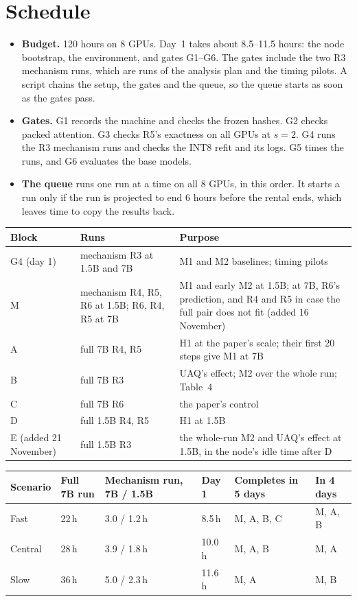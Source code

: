 \documentclass[11pt]{article}
\begin{document}
\section{Schedule}\label{sec:schedule}
\begin{itemize}
\item \textbf{Budget.} 120 hours on 8 GPUs. Day~1 takes about 8.5--11.5 hours: the node bootstrap, the environment, and gates G1--G6. The gates include the two R3 mechanism runs, which are runs of the analysis plan and the timing pilots. A script chains the setup, the gates and the queue, so the queue starts as soon as the gates pass.
\item \textbf{Gates.} G1 records the machine and checks the frozen hashes. G2 checks packed attention. G3 checks R5's exactness on all GPUs at $s=2$. G4 runs the R3 mechanism runs and checks the INT8 refit and its logs. G5 times the runs, and G6 evaluates the base models.
\item \textbf{The queue} runs one run at a time on all 8 GPUs, in this order. It starts a run only if the run is projected to end 6 hours before the rental ends, which leaves time to copy the results back.
\end{itemize}
\begin{center}\small
\begin{tabularx}{\linewidth}{@{}l l L@{}}
\toprule
Block & Runs & Purpose\\
\midrule
G4 (day 1) & mechanism R3 at 1.5B and 7B & M1 and M2 baselines; timing pilots\\
M & mechanism R4, R5, R6 at 1.5B; R6, R4, R5 at 7B & M1 and early M2 at 1.5B; at 7B, R6's prediction, and R4 and R5 in case the full pair does not fit (added 16 November)\\
A & full 7B R4, R5 & H1 at the paper's scale; their first 20 steps give M1 at 7B\\
B & full 7B R3 & UAQ's effect; M2 over the whole run; Table~4\\
C & full 7B R6 & the paper's control\\
D & full 1.5B R4, R5 & H1 at 1.5B\\
E (added 21 November) & full 1.5B R3 & the whole-run M2 and UAQ's effect at 1.5B, in the node's idle time after D\\
\bottomrule
\end{tabularx}
\end{center}
\begin{center}\small
\begin{tabular}{@{}l l l l l l@{}}
\toprule
Scenario & Full 7B run & Mechanism run, 7B / 1.5B & Day 1 & Completes in 5 days & In 4 days\\
\midrule
Fast & 22\,h & 3.0 / 1.2\,h & 8.5\,h & M, A, B, C & M, A, B\\
Central & 28\,h & 3.9 / 1.8\,h & 10.0\,h & M, A, B & M, A\\
Slow & 36\,h & 5.0 / 2.3\,h & 11.6\,h & M, A & M, B\\
\bottomrule
\end{tabular}
\end{center}
\end{document}
